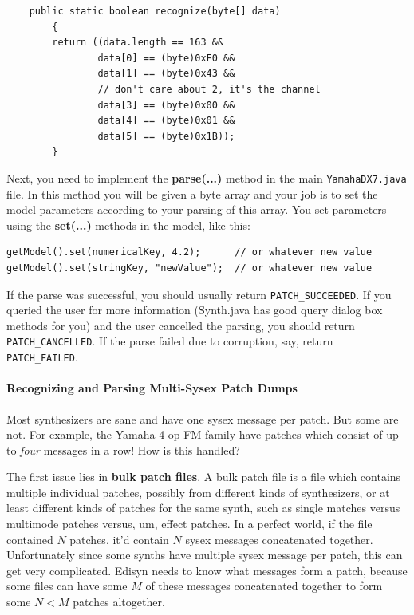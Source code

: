 \documentclass{article}
\begin{document}
\begin{verbatim}
    public static boolean recognize(byte[] data)
        {
        return ((data.length == 163 &&
                data[0] == (byte)0xF0 &&
                data[1] == (byte)0x43 &&
                // don't care about 2, it's the channel
                data[3] == (byte)0x00 &&
                data[4] == (byte)0x01 &&
                data[5] == (byte)0x1B));            
        }
\end{verbatim}

Next, you need to implement the {\bf parse(...)} method in the main {\tt YamahaDX7.java} file.  In this method you will be given a byte array and your job is to set the model parameters according to your parsing of this array.  You set parameters using the {\bf set(...)} methods in the model, like this:

\begin{verbatim}
getModel().set(numericalKey, 4.2);		// or whatever new value
getModel().set(stringKey, "newValue");	// or whatever new value
\end{verbatim}

If the parse was successful, you should usually return {\tt PATCH\_SUCCEEDED}.  If you queried the user for more information (Synth.java has good query dialog box methods for you) and the user cancelled the parsing, you should return {\tt PATCH\_CANCELLED}.  If the parse failed due to corruption, say, return {\tt PATCH\_FAILED}.

\paragraph{Recognizing and Parsing Multi-Sysex Patch Dumps}
Most synthesizers are sane and have one sysex message per patch.  But some are not.  For example, the Yamaha 4-op FM family have patches which consist of up to {\it four} messages in a row!  How is this handled?

The first issue lies in {\bf bulk patch files}.  A bulk patch file is a file which contains multiple individual patches, possibly from different kinds of synthesizers, or at least different kinds of patches for the same synth, such as single matches versus multimode patches versus, um, effect patches.  In a perfect world, if the file contained \(N\) patches, it'd contain \(N\) sysex messages concatenated together.  Unfortunately since some synths have multiple sysex message per patch, this can get very complicated.   Edisyn needs to know what messages form a patch, because some files can have some \(M\) of these messages concatenated together to form some \(N<M\) patches altogether.   
\end{document}
